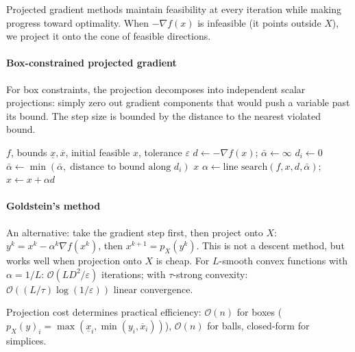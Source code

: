 Projected gradient methods maintain feasibility at every iteration while making progress toward optimality.
When $-\nabla f(x)$ is infeasible (it points outside $X$), we project it onto the cone of feasible directions.

\paragraph{Box-constrained projected gradient}

For box constraints, the projection decomposes into independent scalar projections: simply zero out gradient components that would push a variable past its bound.
The step size is bounded by the distance to the nearest violated bound.

\begin{algorithm}
	\caption{Box-Constrained Projected Gradient (BCPGM)}
	\label{alg:BCPGM}
	\begin{algorithmic}[1]
		\Require $f$, bounds $\underline{x}, \overline{x}$, initial feasible $x$, tolerance $\varepsilon$
				\State $d \gets -\nabla f(x)$;\; $\bar{\alpha} \gets \infty$
						\State $d_i \gets 0$ 
						\State $\bar{\alpha} \gets \min(\bar{\alpha},\; \text{distance to bound along } d_i)$
					\EndIf
				\EndFor
				 \Return $x$ \EndIf
				\State $\alpha \gets \text{line search}(f, x, d, \bar{\alpha})$;\; $x \gets x + \alpha d$
			\EndWhile
		\EndProcedure
	\end{algorithmic}
\end{algorithm}

\paragraph{Goldstein's method}

An alternative: take the gradient step first, then project onto $X$:
$y^k = x^k - \alpha^k \nabla f(x^k)$, then $x^{k+1} = p_X(y^k)$.
This is not a descent method, but works well when projection onto $X$ is cheap.
For $L$-smooth convex functions with $\alpha = 1/L$: $\mathcal{O}(LD^2/\varepsilon)$ iterations; with $\tau$-strong convexity: $\mathcal{O}((L/\tau)\log(1/\varepsilon))$ linear convergence.

Projection cost determines practical efficiency: $\mathcal{O}(n)$ for boxes ($p_X(y)_i = \max(\underline{x}_i, \min(y_i, \overline{x}_i))$), $\mathcal{O}(n)$ for balls, closed-form for simplices.

